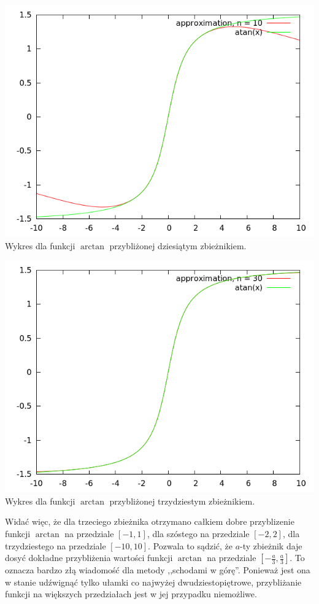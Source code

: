 \documentclass[11pt,leqno]{article}
\begin{document}
\begin{center}
\includegraphics[scale=0.4,natwidth=640,natheight=480]{plot/atan10.png}\\
Wykres dla funkcji $\arctan$ przybliżonej dziesiątym zbieżnikiem.

\includegraphics[scale=0.4,natwidth=640,natheight=480]{plot/atan30.png}\\
Wykres dla funkcji $\arctan$ przybliżonej trzydziestym zbieżnikiem.
\end{center}

Widać więc, że dla trzeciego zbieżnika otrzymano całkiem dobre przyblizenie funkcji $\arctan$ na przedziale $[-1, 1]$, dla szóstego na przedziale $[-2, 2]$, dla trzydziestego na przedziale $[-10, 10]$. Pozwala to sądzić, że $a$-ty zbieżnik daje dosyć dokładne przybliżenia wartości funkcji $\arctan$ na przedziale $[-\frac{a}{3}, \frac{a}{3}]$. To oznacza bardzo złą wiadomość dla metody ,,schodami w górę''. Ponieważ jest ona w stanie udźwignąć tylko ułamki co najwyżej dwudziestopiętrowe, przybliżanie funkcji na większych przedziałach jest w jej przypadku niemożliwe.
\end{document}
